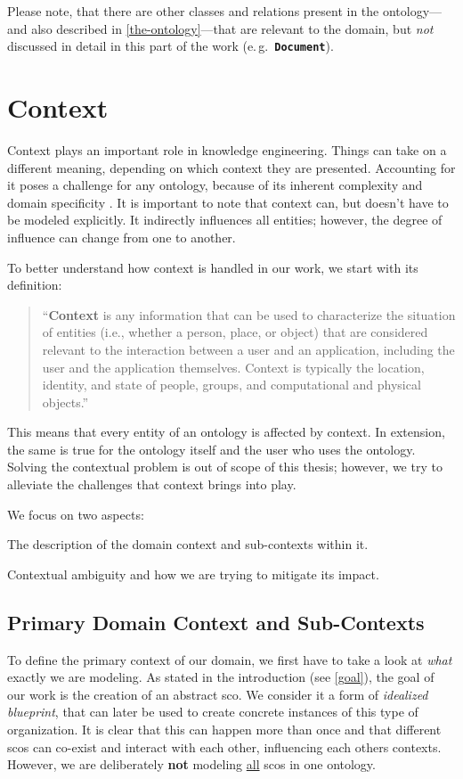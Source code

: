 \documentclass[a4paper, DIV=13, BCOR=0cm]{scrbook}
\newcommand{\eg}{e.\,g.\ }
\newcommand{\class}[1]{\texttt{\textbf{#1}}}
\begin{document}
Please note, that there are other classes and relations present in the ontology---and also described in \autoref{the-ontology}---that are relevant to the domain, but \textit{not} discussed in detail in this part of the work (\eg \class{Document}).

\section{Context}
\label{context}
Context plays an important role in knowledge engineering. Things can take on a different meaning, depending on which context they are presented. Accounting for it poses a challenge for any ontology, because of its inherent complexity and domain specificity \cite[p.\,1]{moore2012intelligent}. It is important to note that context can, but doesn't have to be modeled explicitly. It indirectly influences all entities; however, the degree of influence can change from one to another.

To better understand how context is handled in our work, we start with its definition:
\begin{quote}
	\enquote{\textbf{Context} is any information that can be used to characterize the situation of entities (i.e., whether a person, place, or object) that are considered relevant to the interaction between a user and an application, including the user and the application themselves. Context is typically the location, identity, and state of people, groups, and computational and physical objects.} \cite[p.\,106]{dey2001conceptual}
\end{quote}

This means that every entity of an ontology is affected by context. In extension, the same is true for the ontology itself and the user who uses the ontology. Solving the contextual problem is out of scope of this thesis; however, we try to alleviate the challenges that context brings into play.

We focus on two aspects:
\begin{inparaenum}
	\item The description of the domain context and sub-contexts within it.
	\item Contextual ambiguity and how we are trying to mitigate its impact.
\end{inparaenum}

\subsection{Primary Domain Context and Sub-Contexts}
To define the primary context of our domain, we first have to take a look at \textit{what} exactly we are modeling. As stated in the introduction (see \autoref{goal}), the goal of our work is the creation of an abstract \gls{sco}. We consider it a form of \textit{idealized blueprint}, that can later be used to create concrete instances of this type of organization. It is clear that this can happen more than once and that different \glspl{sco} can co-exist and interact with each other, influencing each others contexts. However, we are deliberately \textbf{not} modeling \underline{all} \glspl{sco} in one ontology.
\end{document}
